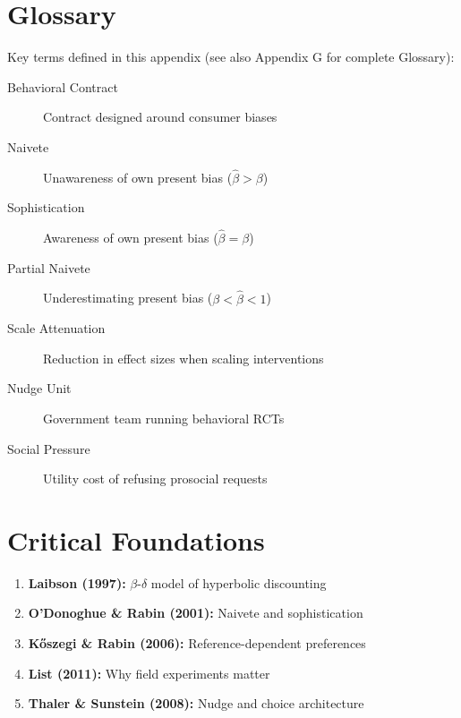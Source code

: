 \section{Glossary}

Key terms defined in this appendix (see also Appendix G for complete Glossary):

\begin{description}
    \item[Behavioral Contract] Contract designed around consumer biases
    \item[Naivete] Unawareness of own present bias ($\hat{\beta} > \beta$)
    \item[Sophistication] Awareness of own present bias ($\hat{\beta} = \beta$)
    \item[Partial Naivete] Underestimating present bias ($\beta < \hat{\beta} < 1$)
    \item[Scale Attenuation] Reduction in effect sizes when scaling interventions
    \item[Nudge Unit] Government team running behavioral RCTs
    \item[Social Pressure] Utility cost of refusing prosocial requests
\end{description}

\section{Critical Foundations}

\begin{enumerate}
    \item \textbf{Laibson (1997):} $\beta$-$\delta$ model of hyperbolic discounting
    \item \textbf{O'Donoghue \& Rabin (2001):} Naivete and sophistication
    \item \textbf{Kőszegi \& Rabin (2006):} Reference-dependent preferences
    \item \textbf{List (2011):} Why field experiments matter
    \item \textbf{Thaler \& Sunstein (2008):} Nudge and choice architecture
\end{enumerate}

